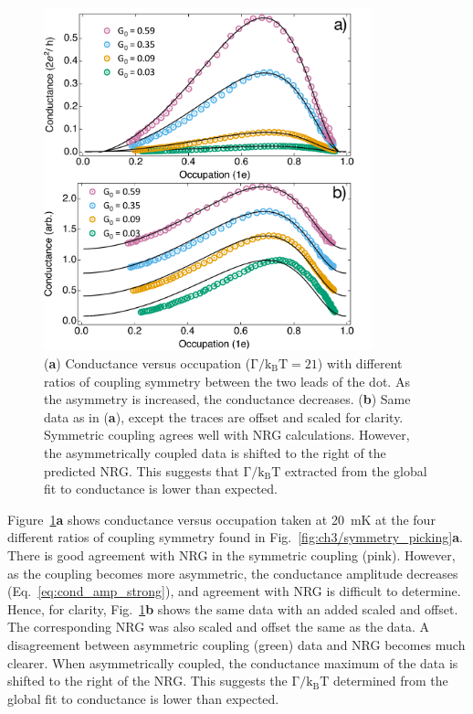 \begin{figure}[!bht]
 \begin{center}
 \includegraphics[width=0.85\textwidth]{figures/ch3/figure19.pdf}
 \caption[Conductance versus Occupation : Varying coupling symmetry]{\label{fig:ch3/cond_occ_assymetry} 
 (\textbf{a}) Conductance versus occupation ($\mathrm{\Gamma/k_BT=21}$) with different ratios of coupling symmetry between the two leads of the dot. As the asymmetry is increased, the conductance decreases.
 (\textbf{b}) Same data as in (\textbf{a}), except the traces are offset and scaled for clarity. Symmetric coupling agrees well with NRG calculations. However, the asymmetrically coupled data is shifted to the right of the predicted NRG. This suggests that $\mathrm{\Gamma/k_BT}$ extracted from the global fit to conductance is lower than expected.}
 \end{center}
\end{figure}


Figure~\ref{fig:ch3/cond_occ_assymetry}\textbf{a} shows conductance versus occupation taken at \qty{20}{mK} at the four different ratios of coupling symmetry found in Fig.~\ref{fig:ch3/symmetry_picking}\textbf{a}. There is good agreement with NRG in the symmetric coupling (pink). However, as the coupling becomes more asymmetric, the conductance amplitude decreases (Eq.~\ref{eq:cond_amp_strong}), and agreement with NRG is difficult to determine. Hence, for clarity, Fig.~\ref{fig:ch3/cond_occ_assymetry}\textbf{b} shows the same data with an added scaled and offset. The corresponding NRG was also scaled and offset the same as the data. A disagreement between asymmetric coupling (green) data and NRG becomes much clearer. When asymmetrically coupled, the conductance maximum of the data is shifted to the right of the NRG. This suggests the $\mathrm{\Gamma/k_BT}$ determined from the global fit to conductance is lower than expected. 



